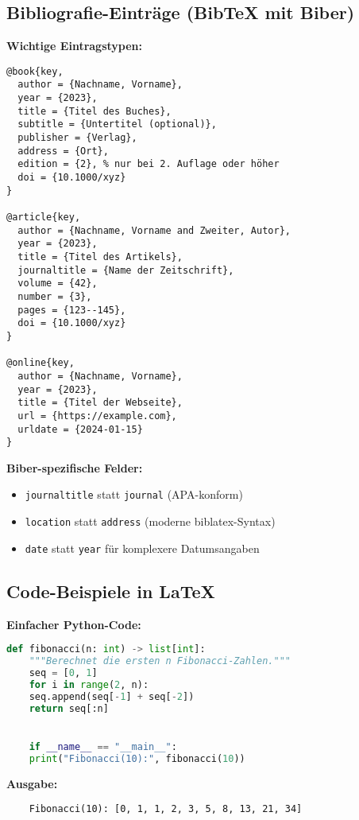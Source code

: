 \documentclass[11pt,a4paper]{article}
\begin{document}
    \subsection*{Bibliografie-Einträge (BibTeX mit Biber)}
    \textbf{Wichtige Eintragstypen:}
    \begin{verbatim}
@book{key,
  author = {Nachname, Vorname},
  year = {2023},
  title = {Titel des Buches},
  subtitle = {Untertitel (optional)},
  publisher = {Verlag},
  address = {Ort},
  edition = {2}, % nur bei 2. Auflage oder höher
  doi = {10.1000/xyz}
}

@article{key,
  author = {Nachname, Vorname and Zweiter, Autor},
  year = {2023},
  title = {Titel des Artikels},
  journaltitle = {Name der Zeitschrift},
  volume = {42},
  number = {3},
  pages = {123--145},
  doi = {10.1000/xyz}
}

@online{key,
  author = {Nachname, Vorname},
  year = {2023},
  title = {Titel der Webseite},
  url = {https://example.com},
  urldate = {2024-01-15}
}
    \end{verbatim}

    \textbf{Biber-spezifische Felder:}
    \begin{itemize}
        \item \verb|journaltitle| statt \verb|journal| (APA-konform)
        \item \verb|location| statt \verb|address| (moderne biblatex-Syntax)
        \item \verb|date| statt \verb|year| für komplexere Datumsangaben
    \end{itemize}

\subsection*{Code-Beispiele in LaTeX}

\textbf{Einfacher Python-Code:}

\begin{lstlisting}[language=Python, caption={Fibonacci-Beispiel}, label={lst:fib}]
    def fibonacci(n: int) -> list[int]:
    """Berechnet die ersten n Fibonacci-Zahlen."""
    seq = [0, 1]
    for i in range(2, n):
    seq.append(seq[-1] + seq[-2])
    return seq[:n]


    if __name__ == "__main__":
    print("Fibonacci(10):", fibonacci(10))
\end{lstlisting}

\textbf{Ausgabe:}
\begin{verbatim}
    Fibonacci(10): [0, 1, 1, 2, 3, 5, 8, 13, 21, 34]
\end{verbatim}
\end{document}
